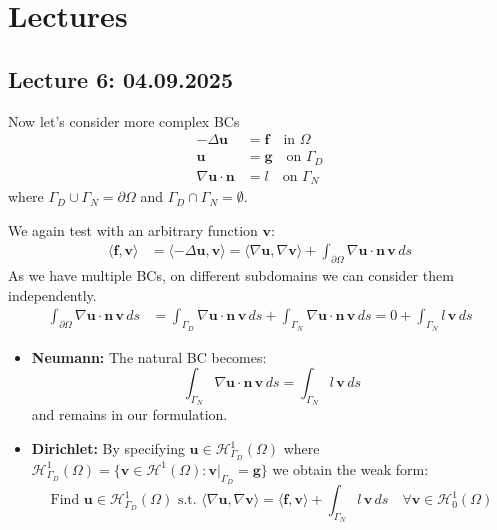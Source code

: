 \chapter{Lectures}

\section{Lecture 6: 04.09.2025}

Now let's consider more complex BCs
\begin{align*}
    -\Delta \mathbf{u}                 & = \mathbf{f} \quad \text{in } \Omega   \\
    \mathbf{u}                         & = \mathbf{g} \quad \text{on } \Gamma_D \\
    \nabla \mathbf{u} \cdot \textbf{n} & = l \quad \text{on } \Gamma_N
\end{align*}
where $\Gamma_D \cup \Gamma_N = \partial \Omega$ and $\Gamma_D \cap \Gamma_N = \emptyset$.

We again test with an arbitrary function $\mathbf{v}$:
\begin{align*}
    \langle \mathbf{f}, \mathbf{v} \rangle & = \langle -\Delta \mathbf{u}, \mathbf{v} \rangle = \langle \nabla \mathbf{u}, \nabla \mathbf{v} \rangle + \int_{\partial \Omega} \nabla \mathbf{u} \cdot \textbf{n} \, \mathbf{v} \, ds
\end{align*}
As we have multiple BCs, on different subdomains we can consider them independently.
\begin{align*}
    \int_{\partial \Omega} \nabla \mathbf{u} \cdot \textbf{n} \, \mathbf{v} \, ds & = \int_{\Gamma_D} \nabla \mathbf{u} \cdot \textbf{n} \, \mathbf{v} \, ds + \int_{\Gamma_N} \nabla \mathbf{u} \cdot \textbf{n} \, \mathbf{v} \, ds = 0 + \int_{\Gamma_N} l \, \mathbf{v} \, ds
\end{align*}

\begin{itemize}
    \item \textbf{Neumann:} The natural BC becomes:
          \[
              \int_{\Gamma_N} \nabla \mathbf{u} \cdot \textbf{n} \, \mathbf{v} \, ds = \int_{\Gamma_N} l \, \mathbf{v} \, ds
          \]
          and remains in our formulation.
    \item \textbf{Dirichlet:} By specifying $\mathbf{u} \in \mathcal{H}^1_{\Gamma_D}(\Omega)$ where $\mathcal{H}^1_{\Gamma_D}(\Omega) = \{ \mathbf{v} \in \mathcal{H}^1(\Omega) : \mathbf{v}\vert_{\Gamma_D} = \mathbf{g} \}$ we obtain the weak form:
          \[
              \text{Find } \mathbf{u} \in \mathcal{H}^1_{\Gamma_D}(\Omega) \text{ s.t. } \langle \nabla \mathbf{u}, \nabla \mathbf{v} \rangle = \langle \mathbf{f}, \mathbf{v} \rangle + \int_{\Gamma_N} l \, \mathbf{v} \, ds \quad \forall \mathbf{v} \in \mathcal{H}^1_0(\Omega)
          \]
\end{itemize}

